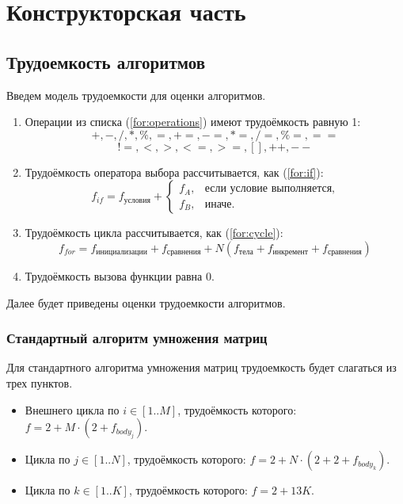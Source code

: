 \chapter{Конструкторская часть}

\section{Трудоемкость алгоритмов}
Введем модель трудоемкости для оценки алгоритмов.
\begin{enumerate}
	\item Операции из списка (\ref{for:operations}) имеют трудоёмкость равную 1:
	\begin{equation}		
		+, -, /, *, \%, =, +=, -=, *=, /=, \%=, ==
		\nonumber
	\end{equation}
\begin{equation}
	\label{for:operations}
	!=, <, >, <=, >=, [], ++, {-}-
		\end{equation}
	\item Трудоёмкость оператора выбора  рассчитывается, как (\ref{for:if}):
	\begin{equation}
		\label{for:if}
		f_{if} = f_{\text{условия}} +
		\begin{cases}
			f_A, & \text{если условие выполняется,}\\
			f_B, & \text{иначе.}
		\end{cases}
	\end{equation}
	\item Трудоёмкость цикла рассчитывается, как (\ref{for:cycle}):
	\begin{equation}
		\label{for:cycle}
		f_{for} = f_{\text{инициализации}} + f_{\text{сравнения}} + N(f_{\text{тела}} + f_{\text{инкремент}} + f_{\text{сравнения}})
	\end{equation}
	\item Трудоёмкость вызова функции равна 0.
\end{enumerate}




Далее будет приведены оценки трудоемкости алгоритмов. 
\subsection{Стандартный алгоритм умножения матриц}

Для стандартного алгоритма умножения матриц трудоемкость будет слагаться из трех пунктов.
\newpage
\begin{itemize}
	\item Внешнего цикла по $i \in [1..M]$, трудоёмкость которого: $f = 2 + M \cdot (2 + f_{body_{j}})$.
	\item Цикла по $j \in [1..N]$, трудоёмкость которого: $f = 2 +  N \cdot (2 + 2 + f_{body_{k}})$.
	\item Цикла по $k \in [1..K]$, трудоёмкость которого: $f = 2 + 13K$. \newline
\end{itemize}


